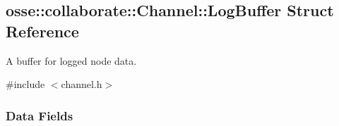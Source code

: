 \hypertarget{structosse_1_1collaborate_1_1_channel_1_1_log_buffer}{}\subsection{osse\+:\+:collaborate\+:\+:Channel\+:\+:Log\+Buffer Struct Reference}
\label{structosse_1_1collaborate_1_1_channel_1_1_log_buffer}


A buffer for logged node data.  




{\ttfamily \#include $<$channel.\+h$>$}

\subsubsection*{Data Fields}
